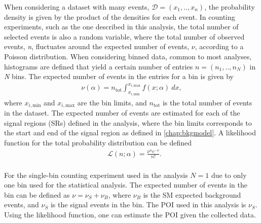 When considering a dataset with many events, $\mathcal{D} = (x_1,..,x_n)$, the probability density is given by the product of the densities for each event. In counting experiments, such as the one described in this analysis, the total number of selected events is also a random variable, where the total number of observed events, \emph{n}, fluctuates around the expected number of events, $\nu$, according to a Poisson distribution. When considering binned data, common to most analyses, histograms are defined that yield a certain number of entries $n = (n_1,..,n_N)$ in \emph{N} bins. The expected number of events in the entries for a bin is given by
\begin{equation}
\begin{aligned}
    \nu(\alpha) = n_{\mathrm{tot}}\int_{x_{i,\mathrm{min}}}^{x_{i,\mathrm{max}}} f(x;\alpha)~dx,
\end{aligned}
\end{equation}
where $x_{i,\mathrm{min}}$ and $x_{i,\mathrm{max}}$ are the bin limits, and $n_{\mathrm{tot}}$ is the total number of events in the dataset. The expected number of events are estimated for each of the signal regions (SRs) defined in the analysis, where the bin limits corresponds to the start and end of the signal region as defined in \cref{chap:bkgmodel}. A likelihood function for the total probability distribution can be defined
\begin{equation}
    \label{eq:poissL}
    \begin{aligned}
        & \mathcal{L}(n;\alpha) = \frac{\nu^{n}e^{-\nu}}{n!}. \\
    \end{aligned}
\end{equation}

For the single-bin counting experiment used in the analysis $N = 1$ due to only one bin used for the statistical analysis. The expected number of events in the bin can be defined as $\nu = \nu_S + \nu_B$, where $\nu_B$ is the SM expected background events, and $\nu_S$ is the signal events in the bin. The POI used in this analysis is $\nu_S$. Using the likelihood function, one can estimate the POI given the collected data. 


